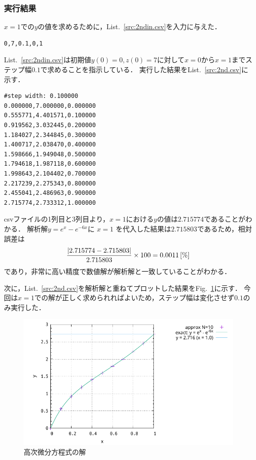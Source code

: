 \documentclass[gutter=20mm,fore-edge=20mm,head_space=30mm,foot_space=30mm]{jlreq}
\begin{document}
\subsubsection{実行結果}
$x=1$での$y$の値を求めるために，List.~\ref{src:2ndin.csv}を入力に与えた．
\begin{lstlisting}[caption=2ndin.csv,label=src:2ndin.csv]
0,7,0.1,0,1
\end{lstlisting}
List.~\ref{src:2ndin.csv}は初期値$y(0) = 0, z(0) = 7$に対して$x=0$から$x=1$までステップ幅$0.1$で求めることを指示している．
実行した結果をList.~\ref{src:2nd.csv}に示す．

\begin{lstlisting}[caption=2nd.csv,label=src:2nd.csv]
#step width: 0.100000
0.000000,7.000000,0.000000
0.555771,4.401571,0.100000
0.919562,3.032445,0.200000
1.184027,2.344845,0.300000
1.400717,2.038470,0.400000
1.598666,1.949048,0.500000
1.794618,1.987118,0.600000
1.998643,2.104402,0.700000
2.217239,2.275343,0.800000
2.455041,2.486963,0.900000
2.715774,2.733312,1.000000
\end{lstlisting}

csvファイルの1列目と3列目より，$x=1$における$y$の値は$2.715774$であることがわかる．
解析解$y = e^x - e^{-6x}$に $x=1$ を代入した結果は$2.715803$であるため，相対誤差は
\begin{equation}
  \frac{|2.715774 - 2.715803|}{2.715803} \times 100 = 0.0011{\,\mathrm{[\%]}}
\end{equation}
であり，非常に高い精度で数値解が解析解と一致していることがわかる．

次に，List.~\ref{src:2nd.csv}を解析解と重ねてプロットした結果をFig.~\ref{fig:2nd}に示す．
今回は$x=1$での解が正しく求められればよいため，ステップ幅は変化させず$0.1$のみ実行した．
\begin{figure}[H]
  \centering
  \includegraphics[width=0.8\linewidth]{2-10.pdf} %
  \caption{高次微分方程式の解}
  \label{fig:2nd}
\end{figure}
\end{document}
